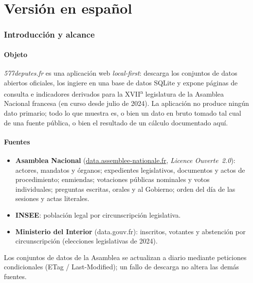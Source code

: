 \clearpage
{}
\part{Versión en español}
\setcounter{section}{0}   %

\section{Introducción y alcance}

\subsection{Objeto}
\emph{577deputes.fr} es una aplicación web \emph{local-first}: descarga los
conjuntos de datos abiertos oficiales, los ingiere en una base de datos SQLite y
expone páginas de consulta e indicadores derivados para la XVII\textsuperscript{a}
legislatura de la Asamblea Nacional francesa (en curso desde julio de 2024). La
aplicación no produce ningún dato primario; todo lo que muestra es, o bien un dato
en bruto tomado tal cual de una fuente pública, o bien el resultado de un cálculo
documentado aquí.

\subsection{Fuentes}
\begin{itemize}
  \item \textbf{Asamblea Nacional} (\href{https://data.assemblee-nationale.fr}{data.assemblee-nationale.fr},
        \emph{Licence Ouverte~2.0}): actores, mandatos y órganos; expedientes
        legislativos, documentos y actos de procedimiento; enmiendas; votaciones
        públicas nominales y votos individuales; preguntas escritas, orales y al
        Gobierno; orden del día de las sesiones y actas literales.
  \item \textbf{INSEE}: población legal por circunscripción legislativa.
  \item \textbf{Ministerio del Interior} (data.gouv.fr): inscritos, votantes y
        abstención por circunscripción (elecciones legislativas de 2024).
\end{itemize}
Los conjuntos de datos de la Asamblea se actualizan a diario mediante peticiones
condicionales (ETag / Last-Modified); un fallo de descarga no altera las demás
fuentes.

